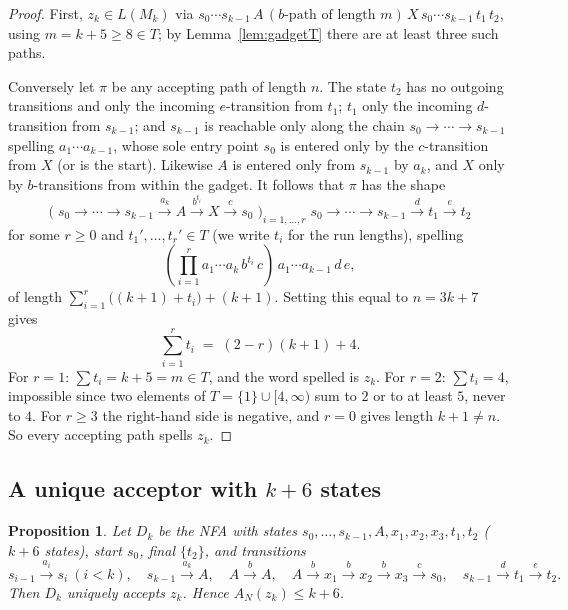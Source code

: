 \documentclass[11pt]{article}
\newtheorem{proposition}[theorem]{Proposition}
\theoremstyle{definition}
\newcommand{\AN}{A_N}
\begin{document}
\begin{proof}
First, $z_k\in L(M_k)$ via
$s_0\cdots s_{k-1}\,A\,(b\text{-path of length }m)\,X\,s_0\cdots
s_{k-1}\,t_1\,t_2$, using $m=k+5\ge 8\in T$; by Lemma~\ref{lem:gadgetT} there
are at least three such paths.

Conversely let $\pi$ be any accepting path of length $n$. The state $t_2$ has
no outgoing transitions and only the incoming $e$-transition from $t_1$; $t_1$
only the incoming $d$-transition from $s_{k-1}$; and $s_{k-1}$ is reachable
only along the chain $s_0\to\cdots\to s_{k-1}$ spelling $a_1\cdots a_{k-1}$,
whose sole entry point $s_0$ is entered only by the $c$-transition from $X$
(or is the start). Likewise $A$ is entered only from $s_{k-1}$ by $a_k$, and
$X$ only by $b$-transitions from within the gadget. It follows that $\pi$ has
the shape
\[
\Big(\;s_0\to\cdots\to s_{k-1}\xrightarrow{a_k}A
\xrightarrow{\,b^{t_i}\,}X\xrightarrow{c}s_0\;\Big)_{i=1,\dots,r}\;
s_0\to\cdots\to s_{k-1}\xrightarrow{d}t_1\xrightarrow{e}t_2
\]
for some $r\ge0$ and $t_1',\dots,t_r'\in T$ (we write $t_i$ for the run
lengths), spelling
\[
	\left(\prod_{i=1}^{r} a_1\cdots a_k\,b^{t_i}\,c\right)\,a_1\cdots a_{k-1}\,d\,e,
\]
of length $\sum_{i=1}^r\big((k+1)+t_i\big)+(k+1)$. Setting this equal to
$n=3k+7$ gives
\[
\sum_{i=1}^r t_i \;=\; (2-r)(k+1)+4 .
\]
For $r=1$: $\sum t_i=k+5=m\in T$, and the word spelled is $z_k$. For $r=2$:
$\sum t_i=4$, impossible since two elements of $T=\{1\}\cup[4,\infty)$ sum to
$2$ or to at least $5$, never to $4$. For $r\ge3$ the right-hand side is
negative, and $r=0$ gives length $k+1\ne n$. So every accepting path spells
$z_k$.
\end{proof}

\subsection{A unique acceptor with \texorpdfstring{$k+6$}{k+6} states}

\begin{proposition}\label{prop:upper-unique}
Let $D_k$ be the NFA with states $s_0,\dots,s_{k-1},A,x_1,x_2,x_3,t_1,t_2$
($k+6$ states), start $s_0$, final $\{t_2\}$, and transitions
\[
s_{i-1}\xrightarrow{a_i}s_i\ (i<k),\quad
s_{k-1}\xrightarrow{a_k}A,\quad
A\xrightarrow{b}A,\quad
A\xrightarrow{b}x_1\xrightarrow{b}x_2\xrightarrow{b}x_3
\xrightarrow{c}s_0,\quad
s_{k-1}\xrightarrow{d}t_1\xrightarrow{e}t_2 .
\]
Then $D_k$ uniquely accepts $z_k$. Hence $\AN(z_k)\le k+6$.
\end{proposition}
\end{document}
